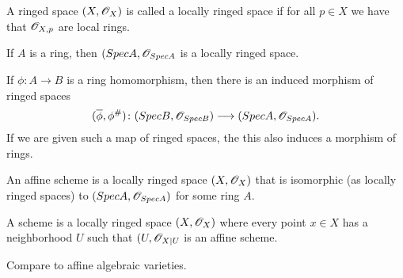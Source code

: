 \begin{definition}
A ringed space $(X, \mathscr{O}_X)$ is called a locally ringed space if for all $p\in X$ we have that $\mathscr{O}_{X,p}$ are local rings. 
\end{definition}

\begin{proposition}
If $A$ is a ring, then $(Spec A, \mathscr{O}_{Spec A}$ is a locally ringed space.
\end{proposition}

\begin{proposition}
If $\phi\colon A\longrightarrow B$ is a ring homomorphism, then there is an induced morphism of ringed spaces 
\begin{equation*}
    (\overline{\phi}, \phi^\#)\colon (Spec B, \mathscr{O}_{Spec B})\longrightarrow (Spec A, \mathscr{O}_{Spec A}).
\end{equation*}
If we are given such a map of ringed spaces, the this also induces a morphism of rings. 
\end{proposition}

\begin{definition}
An affine scheme is a locally ringed space $(X, \mathscr{O}_X)$ that is isomorphic (as locally ringed spaces) to $(Spec A, \mathscr{O}_{Spec A})$ for some ring $A$. 
\end{definition}

\begin{definition}
A scheme is a locally ringed space $(X, \mathscr{O}_X)$ where every point $x\in X$ has a neighborhood $U$ such that $(U, \mathscr{O}_{X|U}$ is an affine scheme. 
\end{definition}

\begin{problem}
Compare to affine algebraic varieties. 
\end{problem}

